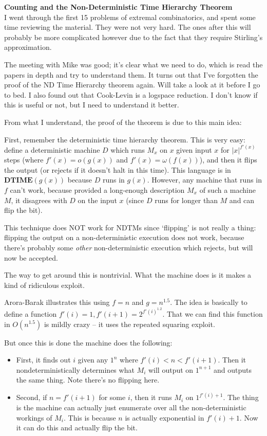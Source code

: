 \documentclass{tufte-book}
\newenvironment{loggentry}[2]%
{\noindent\textbf{#2}\marginnote{#1}\\}{\vspace{0.5cm}}
\begin{document}
	\begin{loggentry}{2024-Feb-15}{Counting and the Non-Deterministic Time Hierarchy Theorem}
		I went through the first 15 problems of extremal combinatorics, and spent some time reviewing the material. They were not very hard. The ones after this will probably be more complicated however due to the fact that they require Stirling's approximation.
		
		The meeting with Mike was good; it's clear what we need to do, which is read the papers in depth and try to understand them. It turns out that I've forgotten the proof of the ND Time Hierarchy theorem again. Will take a look at it before I go to bed. I also found out that Cook-Levin is a logspace reduction. I don't know if this is useful or not, but I need to understand it better.
		
		From what I understand, the proof of the theorem is due to this main idea:
		
		\vspace{2mm}
		
		First, remember the deterministic time hierarchy theorem. This is very easy: define a deterministic machine $D$ which runs $M_x$ on $x$ given input $x$ for $|x|^{f'(x)}$ steps (where $f'(x)=o(g(x))$ and $f'(x)=\omega(f(x))$), and then it flips the output (or rejects if it doesn't halt in this time). This language is in $\mathbf{DTIME}(g(x))$ because $D$ runs in $g(x)$. However, any machine that runs in $f$ can't work, because provided a long-enough description $M_x$ of such a machine $M$, it disagrees with $D$ on the input $x$ (since $D$ runs for longer than $M$ and can flip the bit).
		
		This technique does NOT work for NDTMs since `flipping' is not really a thing: flipping the output on a non-deterministic execution does not work, because there's probably some \textit{other} non-deterministic execution which rejects, but will now be accepted.
		
		The way to get around this is nontrivial. What the machine does is it makes a kind of ridiculous exploit.
		
		\vspace{2mm}
		
		Arora-Barak illustrates this using $f=n$ and $g=n^{1.5}$. The idea is basically to define a function $f'(i)=1, f'(i+1)=2^{{f'(i)}^{1.2}}$. That we can find this function in $O(n^{1.5})$ is mildly crazy -- it uses the repeated squaring exploit.
		
		But once this is done the machine does the following:
		\begin{itemize}
			\item First, it finds out $i$ given any $1^n$ where $f'(i)<n<f'(i+1)$. Then it nondeterministically determines what $M_i$ will output on $1^{n+1}$ and outputs the same thing. Note there's no flipping here.
			\item Second, if $n=f'(i+1)$ for some $i$, then it runs $M_i$ on $1^{f'(i)+1}$. The thing is the machine can actually just enumerate over all the non-deterministic workings of $M_i$. This is because $n$ is actually exponential in $f'(i)+1$. Now it can do this and actually flip the bit.
		\end{itemize}
	

\end{loggentry}
\end{document}
